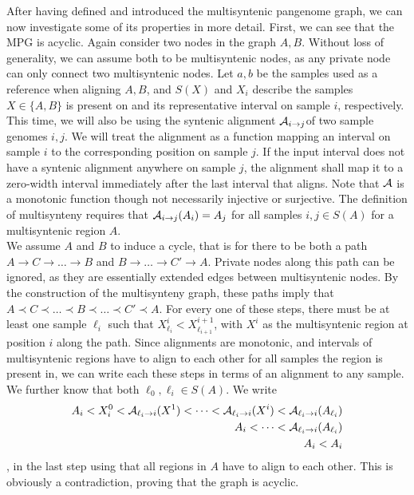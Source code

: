After having defined and introduced the multisyntenic pangenome graph, we can now investigate some of its properties in more detail.
First, we can see that the MPG is acyclic.
Again consider two nodes in the graph $A, B$.
Without loss of generality, we can assume both to be multisyntenic nodes, as any private node can only connect two multisyntenic nodes.
Let $a, b$ be the samples used as a reference when aligning $A, B$, and $S(X)$ and $X_i$ describe the samples $X \in \{A, B\}$ is present on and its representative interval on sample $i$, respectively. %
This time, we will also be using the syntenic alignment $\mathcal{A}_{i\to j}$of two sample genomes $i, j$.
We will treat the alignment as a function mapping an interval on sample $i$ to the corresponding position on sample $j$.
If the input interval does not have a syntenic alignment anywhere on sample $j$, the alignment shall map it to a zero-width interval immediately after the last interval that aligns.
Note that $\mathcal{A}$ is a monotonic function though not necessarily injective or surjective.
The definition of multisynteny requires that $\mathcal{A}_{i\to j}(A_i) = A_j$ for all samples $i, j \in S(A)$ for a multisyntenic region $A$.\\
We assume $A$ and $B$ to induce a cycle, that is for there to be both a path $A\to C\to\dots\to B$ and $B\to\dots\to C'\to A$.
Private nodes along this path can be ignored, as they are essentially extended edges between multisyntenic nodes.
By the construction of the multisynteny graph, these paths imply that $A\prec C\prec\dots\prec B\prec \dots \prec C'\prec A$.
For every one of these steps, there must be at least one sample $\ell_i$ such that $X^i_{\ell_i} < X^{i+1}_{\ell_{i+1}}$, with $X^i$ as the multisyntenic region at position $i$ along the path.
Since alignments are monotonic, and intervals of multisyntenic regions have to align to each other for all samples the region is present in, we can write each these steps in terms of an alignment to any sample.
We further know that both $\ell_0, \ell_i \in S(A)$.
We write
\begin{eqnarray*}
A_i < X^0_i < \mathcal{A}_{\ell_i \to i}(X^1) <\dots < \mathcal{A}_{\ell_{i} \to i} (X^{i}) < \mathcal{A}_{\ell_i \to i} (A_{\ell_i})\\
A_i < \dots < \mathcal{A}_{\ell_i \to i} (A_{\ell_i})\\
A_i < A_i
\end{eqnarray*}
, in the last step using that all regions in $A$ have to align to each other.
This is obviously a contradiction, proving that the graph is acyclic.

